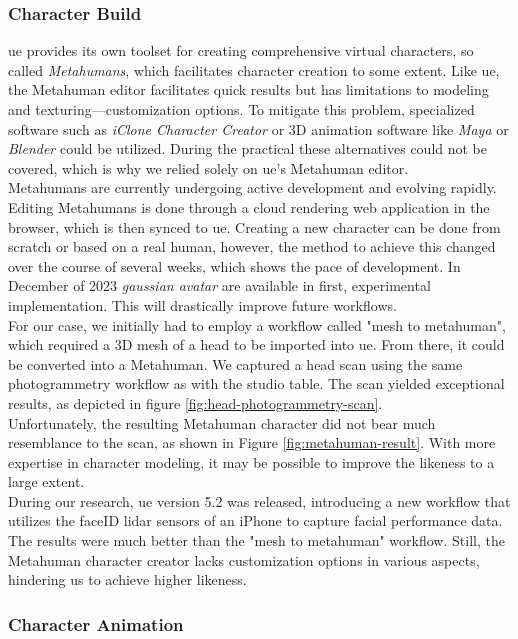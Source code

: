 \documentclass[
  a4paper,  %
  twoside,  %
  bibliography=totoc,
  headsepline,
  cleardoublepage=empty,
  parskip=half,
  draft=false
]{scrbook}
\begin{document}
\subsubsection*{Character Build}
\gls{ue} provides its own toolset for creating comprehensive virtual characters, so called \textit{Metahumans}, which facilitates character creation to some extent. Like \gls{ue}, the Metahuman editor facilitates quick results but has limitations to modeling and texturing—customization options. To mitigate this problem, specialized software such as \textit{iClone Character Creator} or 3D animation software like \textit{Maya} or \textit{Blender} could be utilized. During the practical these alternatives could not be covered, which is why we relied solely on \gls{ue}'s Metahuman editor. \\
Metahumans are currently undergoing active development and evolving rapidly. Editing Metahumans is done through a cloud rendering web application in the browser, which is then synced to \gls{ue}. Creating a new character can be done from scratch or based on a real human, however, the method to achieve this changed over the course of several weeks, which shows the pace of development. In December of 2023 \textit{gaussian avatar} are available in first, experimental implementation. This will drastically improve future workflows. \\
For our case, we initially had to employ a workflow called "mesh to metahuman", which required a 3D mesh of a head to be imported into \gls{ue}. From there, it could be converted into a Metahuman. We captured a head scan using the same photogrammetry workflow as with the studio table. The scan yielded exceptional results, as depicted in figure \ref{fig:head-photogrammetry-scan}. \\
Unfortunately, the resulting Metahuman character did not bear much resemblance to the scan, as shown in Figure \ref{fig:metahuman-result}. With more expertise in character modeling, it may be possible to improve the likeness to a large extent. \\
During our research, \gls{ue} version 5.2 was released, introducing a new workflow that utilizes the faceID lidar sensors of an iPhone to capture facial performance data. The results were much better than the "mesh to metahuman" workflow. Still, the Metahuman character creator lacks customization options in various aspects, hindering us to achieve higher likeness.

\subsubsection*{Character Animation}
\end{document}
